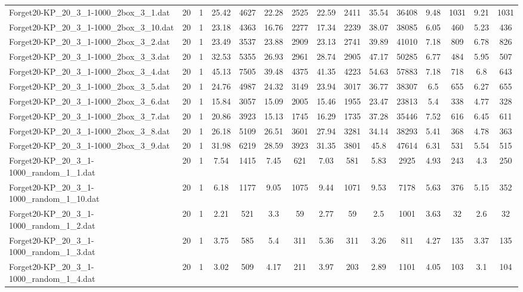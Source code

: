 \begin{table}[!ht]
{\begin{tabular}{lcccccccccccccc}
Forget20-KP\_20\_3\_1-1000\_2box\_3\_1.dat & 20 & 1 & 25.42 & 4627 & 22.28 & 2525 & 22.59 & 2411 & 35.54 & 36408 & 9.48 & 1031 & 9.21 & 1031 \\
Forget20-KP\_20\_3\_1-1000\_2box\_3\_10.dat & 20 & 1 & 23.18 & 4363 & 16.76 & 2277 & 17.34 & 2239 & 38.07 & 38085 & 6.05 & 460 & 5.23 & 436 \\
Forget20-KP\_20\_3\_1-1000\_2box\_3\_2.dat & 20 & 1 & 23.49 & 3537 & 23.88 & 2909 & 23.13 & 2741 & 39.89 & 41010 & 7.18 & 809 & 6.78 & 826 \\
Forget20-KP\_20\_3\_1-1000\_2box\_3\_3.dat & 20 & 1 & 32.53 & 5355 & 26.93 & 2961 & 28.74 & 2905 & 47.17 & 50285 & 6.77 & 484 & 5.95 & 507 \\
Forget20-KP\_20\_3\_1-1000\_2box\_3\_4.dat & 20 & 1 & 45.13 & 7505 & 39.48 & 4375 & 41.35 & 4223 & 54.63 & 57883 & 7.18 & 718 & 6.8 & 643 \\
Forget20-KP\_20\_3\_1-1000\_2box\_3\_5.dat & 20 & 1 & 24.76 & 4987 & 24.32 & 3149 & 23.94 & 3017 & 36.77 & 38307 & 6.5 & 655 & 6.27 & 655 \\
Forget20-KP\_20\_3\_1-1000\_2box\_3\_6.dat & 20 & 1 & 15.84 & 3057 & 15.09 & 2005 & 15.46 & 1955 & 23.47 & 23813 & 5.4 & 338 & 4.77 & 328 \\
Forget20-KP\_20\_3\_1-1000\_2box\_3\_7.dat & 20 & 1 & 20.86 & 3923 & 15.13 & 1745 & 16.29 & 1735 & 37.28 & 35446 & 7.52 & 616 & 6.45 & 611 \\
Forget20-KP\_20\_3\_1-1000\_2box\_3\_8.dat & 20 & 1 & 26.18 & 5109 & 26.51 & 3601 & 27.94 & 3281 & 34.14 & 38293 & 5.41 & 368 & 4.78 & 363 \\
Forget20-KP\_20\_3\_1-1000\_2box\_3\_9.dat & 20 & 1 & 31.98 & 6219 & 28.59 & 3923 & 31.35 & 3801 & 45.8 & 47614 & 6.31 & 531 & 5.54 & 515 \\
Forget20-KP\_20\_3\_1-1000\_random\_1\_1.dat & 20 & 1 & 7.54 & 1415 & 7.45 & 621 & 7.03 & 581 & 5.83 & 2925 & 4.93 & 243 & 4.3 & 250 \\
Forget20-KP\_20\_3\_1-1000\_random\_1\_10.dat & 20 & 1 & 6.18 & 1177 & 9.05 & 1075 & 9.44 & 1071 & 9.53 & 7178 & 5.63 & 376 & 5.15 & 352 \\
Forget20-KP\_20\_3\_1-1000\_random\_1\_2.dat & 20 & 1 & 2.21 & 521 & 3.3 & 59 & 2.77 & 59 & 2.5 & 1001 & 3.63 & 32 & 2.6 & 32 \\
Forget20-KP\_20\_3\_1-1000\_random\_1\_3.dat & 20 & 1 & 3.75 & 585 & 5.4 & 311 & 5.36 & 311 & 3.26 & 811 & 4.27 & 135 & 3.37 & 135 \\
Forget20-KP\_20\_3\_1-1000\_random\_1\_4.dat & 20 & 1 & 3.02 & 509 & 4.17 & 211 & 3.97 & 203 & 2.89 & 1101 & 4.05 & 103 & 3.1 & 104 \\

\end{tabular}}
\end{table}
